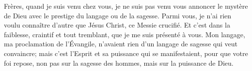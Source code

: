 Frères, quand je suis venu chez vous,
	je ne suis pas venu vous annoncer le mystère de Dieu
		avec le prestige du langage ou de la sagesse.
Parmi vous, je n’ai rien voulu connaître d’autre que Jésus Christ,
	ce Messie crucifié.
Et c’est dans la faiblesse, craintif et tout tremblant,
	que je me suis présenté à vous.
Mon langage, ma proclamation de l’Évangile,
	n’avaient rien d’un langage de sagesse qui veut convaincre;
	mais c’est l’Esprit et sa puissance qui se manifestaient,
	pour que votre foi repose, non pas sur la sagesse des hommes,
	mais sur la puissance de Dieu.
